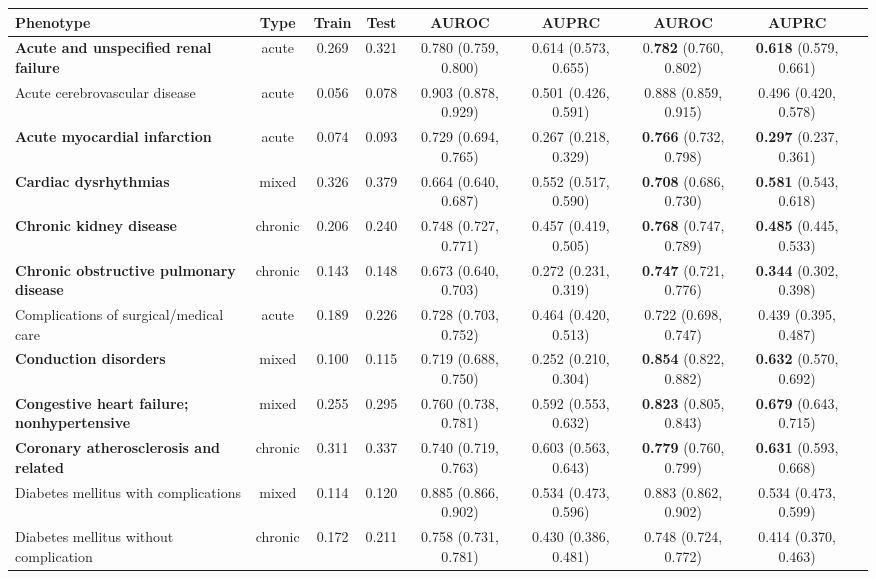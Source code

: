 \documentclass[pmlr]{jmlr}
\begin{document}
\begin{table*}[t!]
{\begin{tabular}{l c c c| c  c| c c c}
    \textbf{Phenotype} & \textbf{Type} & \textbf{Train} & \textbf{Test} & \textbf{AUROC} & \textbf{AUPRC} & \textbf{AUROC} & \textbf{AUPRC} \\
    \midrule
\textbf{Acute and unspecified renal failure} & acute & 0.269 & 0.321 & 0.780 (0.759, 0.800) & 0.614 (0.573, 0.655) & 0.\textbf{782} (0.760, 0.802) & \textbf{0.618} (0.579, 0.661)
 \\ 
    Acute cerebrovascular disease & acute& 0.056& 0.078 &0.903 (0.878, 0.929) & 0.501 (0.426, 0.591)  &0.888 (0.859, 0.915) & 0.496 (0.420, 0.578)\\ 
    \textbf{Acute myocardial infarction} & acute& 0.074& 0.093 & 0.729 (0.694, 0.765) & 0.267 (0.218, 0.329)  & \textbf{0.766} (0.732, 0.798) & \textbf{0.297} (0.237, 0.361)\\ 
    \textbf{Cardiac dysrhythmias} & mixed & 0.326 & 0.379 & 0.664 (0.640, 0.687) & 0.552 (0.517, 0.590)  & \textbf{0.708} (0.686, 0.730) & \textbf{0.581} (0.543, 0.618) \\ 
    \textbf{Chronic kidney disease} & chronic & 0.206& 0.240 & 0.748 (0.727, 0.771) & 0.457 (0.419, 0.505) & \textbf{0.768} (0.747, 0.789) & \textbf{0.485} (0.445, 0.533)\\ 
    \textbf{Chronic obstructive pulmonary disease} & chronic& 0.143 & 0.148 & 0.673 (0.640, 0.703) & 0.272 (0.231, 0.319) & \textbf{0.747} (0.721, 0.776) & \textbf{0.344} (0.302, 0.398)\\ 
    Complications of surgical/medical care & acute &0.189 & 0.226 & 0.728 (0.703, 0.752) & 0.464 (0.420, 0.513)  &0.722 (0.698, 0.747) & 0.439 (0.395, 0.487) \\ 
    \textbf{Conduction disorders} & mixed & 0.100 & 0.115 & 0.719 (0.688, 0.750) & 0.252 (0.210, 0.304)  & \textbf{0.854} (0.822, 0.882) & \textbf{0.632} (0.570, 0.692)\\ 
    \textbf{Congestive heart failure; nonhypertensive} & mixed &0.255 &0.295 & 0.760 (0.738, 0.781) & 0.592 (0.553, 0.632)  &\textbf{0.823} (0.805, 0.843) & \textbf{0.679} (0.643, 0.715) \\ 
    \textbf{Coronary atherosclerosis and related} & chronic & 0.311 &0.337 & 0.740 (0.719, 0.763) & 0.603 (0.563, 0.643) & \textbf{0.779} (0.760, 0.799) & \textbf{0.631} (0.593, 0.668)\\ 
    Diabetes mellitus with complications & mixed & 0.114 &0.120 & 0.885 (0.866, 0.902) & 0.534 (0.473, 0.596) &0.883 (0.862, 0.902) & 0.534 (0.473, 0.599)\\ 
    Diabetes mellitus without complication & chronic & 0.172 &0.211 & 0.758 (0.731, 0.781) & 0.430 (0.386, 0.481)  &0.748 (0.724, 0.772) & 0.414 (0.370, 0.463)\\ 

\end{tabular}}
\end{table*}
\end{document}
